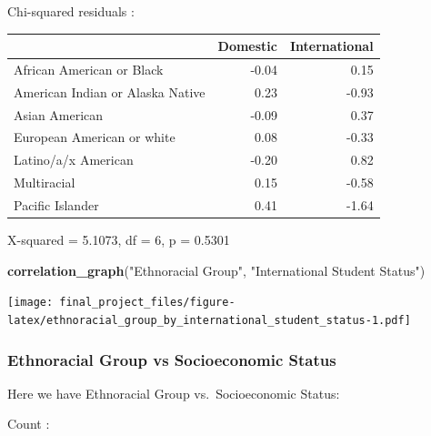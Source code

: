 \documentclass[
  twocolumn]{article}
\newenvironment{Shaded}{\begin{snugshade}}{\end{snugshade}}
\newcommand{\FunctionTok}[1]{\textcolor[rgb]{0.13,0.29,0.53}{\textbf{#1}}}
\newcommand{\NormalTok}[1]{#1}
\newcommand{\SpecialCharTok}[1]{\textcolor[rgb]{0.81,0.36,0.00}{\textbf{#1}}}
\newcommand{\StringTok}[1]{\textcolor[rgb]{0.31,0.60,0.02}{#1}}
\begin{document}
Chi-squared residuals :

\begin{longtable}[]{@{}lrr@{}}
\toprule\noalign{}
& Domestic & International \\
\midrule\noalign{}
\endhead
\bottomrule\noalign{}
\endlastfoot
African American or Black & -0.04 & 0.15 \\
American Indian or Alaska Native & 0.23 & -0.93 \\
Asian American & -0.09 & 0.37 \\
European American or white & 0.08 & -0.33 \\
Latino/a/x American & -0.20 & 0.82 \\
Multiracial & 0.15 & -0.58 \\
Pacific Islander & 0.41 & -1.64 \\
\end{longtable}

X-squared = 5.1073, df = 6, p = 0.5301

\begin{Shaded}
\begin{Highlighting}[]
\FunctionTok{correlation\_graph}\NormalTok{(}\StringTok{"Ethnoracial Group"}\NormalTok{, }\StringTok{"International Student Status"}\NormalTok{)}
\end{Highlighting}
\end{Shaded}

\texttt{[image: final\_project\_files/figure-latex/ethnoracial\_group\_by\_international\_student\_status-1.pdf]}

\subsubsection{Ethnoracial Group vs Socioeconomic
Status}\label{ethnoracial-group-vs-socioeconomic-status}

Here we have Ethnoracial Group vs.~Socioeconomic Status:

\begin{Shaded}
\end{Shaded}

Count :
\end{document}
